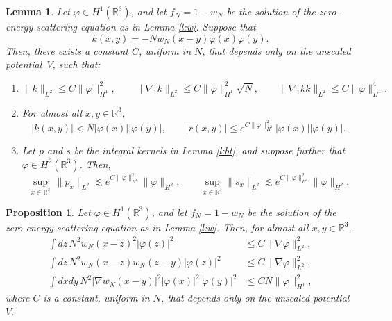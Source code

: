 \documentclass[11pt,a4paper]{scrartcl}
\newtheorem{prp}[thm]{Proposition}
\newtheorem{lem}[thm]{Lemma}
\newcommand{\R}{\mathds{R}}
\newcommand{\norm}[1]{\lVert#1\rVert}	%
\begin{document}
\begin{lem} \label{l:kernels}
  Let $\varphi \in H^1(\R^3)$, and let $f_N=1-w_N$ be the solution of the
  zero-energy scattering equation as in Lemma \ref{l:w}. Suppose that
  \[
    k(x,y) = - N w_N(x-y) \varphi(x) \varphi(y).
  \]
  Then, there exists a constant $C$, uniform in $N$, that depends only on the
  unscaled potential~$V$, such that: 
  \begin{enumerate}
    \item \label{k}
      \[
        \| k \|_{L^2} \le C \| \varphi \|_{H^1}^2, \qquad \| \nabla_1 k
        \|_{L^2} \le C \| \varphi \|_{H^1}^2 \sqrt{N}, \qquad \| \nabla_1 k
        \overline{k} \|_{L^2} \le C \| \varphi \|_{H^1}^4.
      \]
    \item \label{kr} For almost all $x,y \in \R^3$,
      \[
        |k(x,y)| < N |\varphi(x)| |\varphi(y)|, \qquad |r(x,y)| \le e^{C \|
        \varphi \|_{H^1}^2} |\varphi(x)| |\varphi(y)|.
      \] 
    \item \label{sup} Let $p$ and $s$ be the integral kernels in Lemma
      \ref{l:bt}, and suppose further that $\varphi \in H^2(\R^3)$. Then,
      \[
        \sup_{x \in \R^3} \, \norm{p_x}_{L^2} \apprle e^{C \| \varphi
        \|_{H^1}^2} \norm{\varphi}_{H^2}, \qquad \sup_{x \in \R^3}
        \norm{s_x}_{L^2} \apprle e^{C \| \varphi \|_{H^1}^2}
        \norm{\varphi}_{H^2}.
      \]
  \end{enumerate}
\end{lem}


\begin{prp} \label{p:wphi}
  Let $\varphi \in H^1(\R^3)$, and let $f_N=1-w_N$ be the solution of the
  zero-energy scattering equation as in Lemma \ref{l:w}. Then, for almost all
  $x,y \in \R^3$,
  \begin{align*}
    \int dz \, N^2 w_N(x-z)^2 |\varphi(z)|^2 & \le C \| \nabla \varphi
    \|_{L^2}^2, \\
    \int dz \, N^2 w_N(x-z) w_N(z-y) |\varphi(z)|^2 & \le C \| \nabla \varphi
    \|_{L^2}^2, \\
    \int dx dy \, N^2 |\nabla w_N(x-y)|^2 |\varphi(x)|^2 |\varphi(y)|^2 & \le
    C N \| \varphi \|_{H^1}^2,
  \end{align*}
  where $C$ is a constant, uniform in $N$, that depends only on the unscaled
  potential $V$.
\end{prp}
\end{document}

